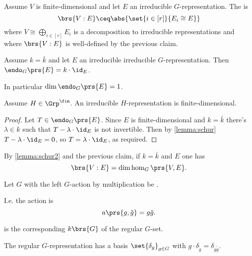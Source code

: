 \documentclass[10pt,a4paper,twoside,openany,hidelinks]{book}
\begin{document}
\begin{definition}
Assume $V$ is finite-dimensional and let $E$ an irreducible $G$-representation. The  is
\[\brs{V:E} \ceq \abs{\set{i \in [r]}{E_i \cong E}}\]
where $V \cong \bigoplus_{i \in [r]} E_i$ is a decomposition to irreducible representations and where $\brs{V:E}$ is well-defined by the previous claim.
\end{definition}

\begin{lemma}[Schur (2)] \label{lemma:schur2}
Assume $k = \bar{k}$ and let $E$ an irreducible irreducible $G$-representation. Then $\endo_G\prs{E} = k \cdot \id_E$.

In particular $\dim \endo_G\prs{E} = 1$.
\end{lemma}

\begin{exercise}
Assume $H \in \Grp^\fin$. An irreducible $H$-representation is finite-dimensional.
\end{exercise}

\begin{proof}
Let $T \in \endo_G\prs{E}$. Since $E$ is finite-dimensional and $k = \bar{k}$ there's $\lambda \in k$ such that $T - \lambda \cdot \id_E$ is not invertible. Then by \ref{lemma:schur}
$T - \lambda \cdot \id_E = 0$, so $T = \lambda \cdot \id_E$, as required.
\end{proof}

\begin{corollary}
By \ref{lemma:schur2} and the previous claim, if $k = \bar{k}$ and $E$ one has
\[\brs{V : E} = \dim \hom_G\prs{V,E} \text{.}\]
\end{corollary}

\begin{definition}
Let $G$ with the left $G$-action by multiplication be .

I.e. the action is
\[a\prs{g, \tilde{g}} = g \tilde{g} \text{.}\]
\end{definition}

\begin{definition}\label{definition:regular_representation}
 is the corresponding $k\brs{G}$ of the regular $G$-set.
\end{definition}

\begin{remark}
The regular $G$-representation has a basis $\set{\delta_g}_{g \in G}$ with $g \cdot \delta_{\tilde{g}} = \delta_{g \tilde{g}}$.
\end{remark}
\end{document}
